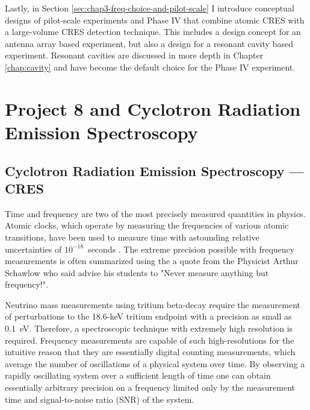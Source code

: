 Lastly, in Section \ref{sec:chap3-freq-choice-and-pilot-scale} I introduce conceptual designs of pilot-scale experiments and Phase IV that combine atomic CRES with a large-volume CRES detection technique. This includes a design concept for an antenna array based experiment, but also a design for a resonant cavity based experiment. Resonant cavities are discussed in more depth in Chapter \ref{chap:cavity} and have become the default choice for the Phase IV experiment.

\section{Project 8 and Cyclotron Radiation Emission Spectroscopy}
\label{sec:chap3-cres-and-p8}

\subsection{Cyclotron Radiation Emission Spectroscopy --- CRES}
\label{sec:chap3-cres}

Time and frequency are two of the most precisely measured quantities in physics. %
Atomic clocks, which operate by measuring the frequencies of various atomic transitions, have been used to measure time with astounding relative uncertainties of $10^{-18}$~seconds \cite{atomic_clock}. The extreme precision possible with frequency measurements is often summarized using the a quote from the Physicist Arthur Schawlow who said advise his students to "Never measure anything but frequency!"\cite{never_meas_anything_but_freq}. 

Neutrino mass measurements using tritium beta-decay require the measurement of perturbations to the 18.6-keV tritium endpoint with a precision as small as 0.1~eV. Therefore, a spectroscopic technique with extremely high resolution is required. Frequency measurements are capable of such high-resolutions for the intuitive reason that they are essentially digital counting measurements, which average the number of oscillations of a physical system over time. By observing a rapidly oscillating system over a sufficient length of time one can obtain essentially arbitrary precision on a frequency limited only by the measurement time and signal-to-noise ratio (SNR) of the system.

